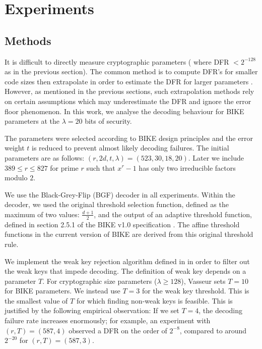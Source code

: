 \chapter{Experiments}

\section{Methods}

It is difficult to directly measure cryptographic parameters ( where DFR $ < 2^{-128}$ as in the previous section). The common method is to compute DFR's for smaller code sizes then extrapolate in order to estimate the DFR for larger parameters \cite{SV19,DGK20a,DGK20b}. However, as mentioned in the previous sections, such extrapolation methods rely on certain assumptions which may underestimate the DFR and ignore the error floor phenomenon. In this work, we analyse the decoding behaviour for BIKE parameters at the $\lambda = 20$ bits of security.

The parameters were selected according to BIKE design principles and the error weight $t$ is reduced to prevent almost likely decoding failures. The initial parameters are as follows: $(r,2d,t,\lambda) = (523,30,18,20)$. Later we include $389 \le r \le 827$ for prime $r$ such that $x^r - 1$ has only two irreducible factors modulo $2$.

We use the Black-Grey-Flip (BGF) decoder in all experiments. Within the decoder, we used the original threshold selection function, defined as the maximum of two values: $\frac{d+1}{2}$, and the output of an adaptive threshold function, defined in section 2.5.1 of the BIKE v1.0 specification \cite{BIKE2017}. The affine threshold functions in the current version of BIKE are derived from this original threshold rule.

We implement the weak key rejection algorithm defined in \cite[Algorithm 15.3]{Vasseur-thesis} in order to filter out the weak keys that impede decoding. The definition of weak key depends on a parameter $T$. For cryptographic size parameters ($\lambda \geq 128$), Vasseur sets $T=10$ for BIKE parameters. We instead use $T = 3$ for the weak key threshold. This is the smallest value of $T$ for which finding non-weak keys is feasible. This is justified by the following empirical observation: If we set $T = 4$, the decoding failure rate increases enormously; for example, an experiment with $(r, T) = (587, 4)$ observed a DFR on the order of $2^{-8}$, compared to around $2^{-20}$ for $(r, T) = (587, 3)$.


